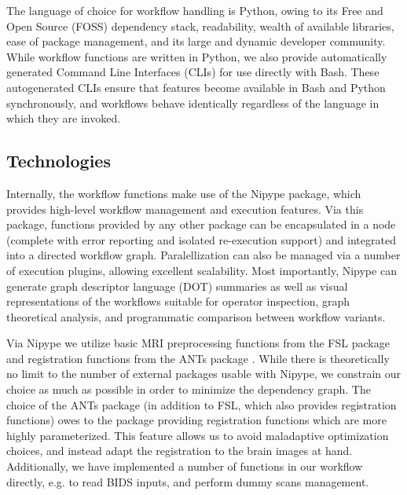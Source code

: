 The language of choice for workflow handling is Python, owing to its Free and Open Source (FOSS) dependency stack, readability, wealth of available libraries, ease of package management, and its large and dynamic developer community.
While workflow functions are written in Python, we also provide automatically generated Command Line Interfaces (CLIs) for use directly with Bash.
These autogenerated CLIs ensure that features become available in Bash and Python synchronously, and workflows behave identically regardless of the language in which they are invoked.

\subsection{Technologies}

Internally, the workflow functions make use of the Nipype \cite{nipype} package, which provides high-level workflow management and execution features.
Via this package, functions provided by any other package can be encapsulated in a node (complete with error reporting and isolated re-execution support) and integrated into a directed workflow graph.
Paralellization can also be managed via a number of execution plugins, allowing excellent scalability.
Most importantly, Nipype can generate graph descriptor language (DOT) summaries as well as visual representations of the workflows suitable for operator inspection, graph theoretical analysis, and programmatic comparison between workflow variants.

Via Nipype we utilize basic MRI preprocessing functions from the FSL package \cite{fsl} and registration functions from the ANTs package \cite{ants}.
While there is theoretically no limit to the number of external packages usable with Nipype, we constrain our choice as much as possible in order to minimize the dependency graph.
The choice of the ANTs package (in addition to FSL, which also provides registration functions) owes to the package providing registration functions which are more highly parameterized.
This feature allows us to avoid maladaptive optimization choices, and instead adapt the registration to the brain images at hand.
Additionally, we have implemented a number of functions in our workflow directly, e.g. to read BIDS \cite{bids} inputs, and perform dummy scans management.

